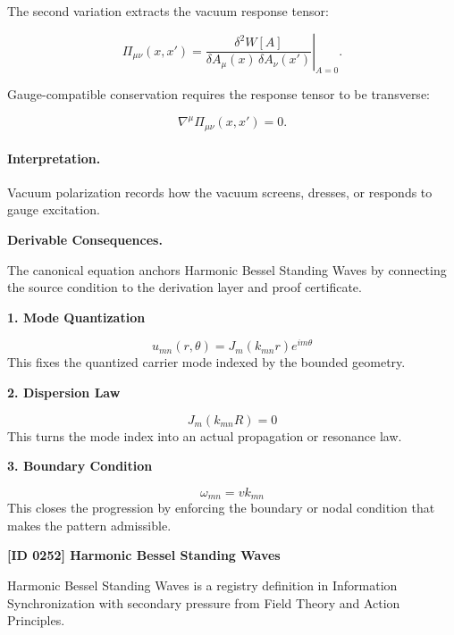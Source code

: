 The second variation extracts the vacuum response tensor:

\begin{equation}
\Pi_{\mu\nu}(x,x')
=
\left.
\frac{\delta^2 W[A]}
{\delta A_\mu(x)\,\delta A_\nu(x')}
\right|_{A=0}.
\end{equation}

Gauge-compatible conservation requires the response tensor to be transverse:

\begin{equation}
\nabla^\mu \Pi_{\mu\nu}(x,x')=0 .
\end{equation}

\paragraph{Interpretation.}
Vacuum polarization records how the vacuum screens, dresses, or responds to gauge excitation.

\par\vspace{0.35em}
\noindent\textbf{Derivable Consequences.}\quad
\begingroup
\footnotesize
\raggedright
The canonical equation anchors Harmonic Bessel Standing Waves by connecting the source condition to the derivation layer and proof certificate.
\par\endgroup

\noindent\textbf{1. Mode Quantization}\par
\[
u_{mn}(r,\theta)=J_m(k_{mn}r)e^{im\theta}
\]
\noindent This fixes the quantized carrier mode indexed by the bounded geometry.\par
\noindent\textbf{2. Dispersion Law}\par
\[
J_m(k_{mn}R)=0
\]
\noindent This turns the mode index into an actual propagation or resonance law.\par
\noindent\textbf{3. Boundary Condition}\par
\[
\omega_{mn}=v k_{mn}
\]
\noindent This closes the progression by enforcing the boundary or nodal condition that makes the pattern admissible.\par

\clearpage
\noindent\textbf{[ID 0252] Harmonic Bessel Standing Waves}\par
\vspace{0.35em}
\begingroup\small
{}
Harmonic Bessel Standing Waves is a registry definition in Information Synchronization with secondary pressure from Field Theory and Action Principles.

